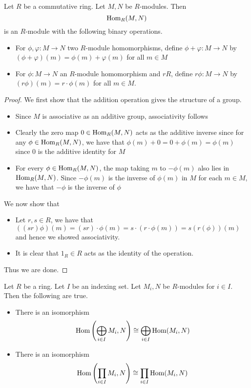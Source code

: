 \documentclass[a4paper]{article}
\begin{document}
\begin{prp}{}{} Let $R$ be a commutative ring. Let $M,N$ be $R$-modules. Then $$\operatorname{Hom}_R(M,N)$$ is an $R$-module with the following binary operations. 
\begin{itemize}
\item For $\phi,\varphi:M\to N$ two $R$-module homomorphisms, define $\phi+\varphi:M\to N$ by $(\phi+\varphi)(m)=\phi(m)+\varphi(m)$ for all $m\in M$
\item For $\phi:M\to N$ an $R$-module homomorphism and $r R$, define $r\phi:M\to N$ by $(r\phi)(m)=r\cdot\phi(m)$ for all $m\in M$. 
\end{itemize} \tcbline
\begin{proof}
We first show that the addition operation gives the structure of a group. 
\begin{itemize}
\item Since $M$ is associative as an additive group, associativity follows
\item Clearly the zero map $0\in\operatorname{Hom}_R(M,N)$ acts as the additive inverse since for any $\phi\in\operatorname{Hom}_R(M,N)$, we have that $\phi(m)+0=0+\phi(m)=\phi(m)$ since $0$ is the additive identity for $M$
\item For every $\phi\in\operatorname{Hom}_R(M,N)$, the map taking $m$ to $-\phi(m)$ also lies in $\operatorname{Hom}_R(M,N)$. Since $-\phi(m)$ is the inverse of $\phi(m)$ in $M$ for each $m\in M$, we have that $-\phi$ is the inverse of $\phi$
\end{itemize}
We now show that 
\begin{itemize}
\item Let $r,s\in R$, we have that $((sr)\phi)(m)=(sr)\cdot\phi(m)=s\cdot(r\cdot\phi(m))=s(r(\phi))(m)$ and hence we showed associativity. 
\item It is clear that $1_R\in R$ acts as the identity of the operation. 
\end{itemize}
Thus we are done. 
\end{proof}
\end{prp}

\begin{prp}{}{} Let $R$ be a ring. Let $I$ be an indexing set. Let $M_i,N$ be $R$-modules for $i\in I$. Then the following are true. 
\begin{itemize}
\item There is an isomorphism $$\operatorname{Hom}\left(\bigoplus_{i\in I}M_i,N\right)\cong\bigoplus_{i\in I}\operatorname{Hom}(M_i,N)$$
\item There is an isomorphism $$\operatorname{Hom}\left(\prod_{i\in I}M_i,N\right)\cong\prod_{i\in I}\operatorname{Hom}(M_i,N)$$
\end{itemize} \tcbline
\end{prp}
\end{document}
